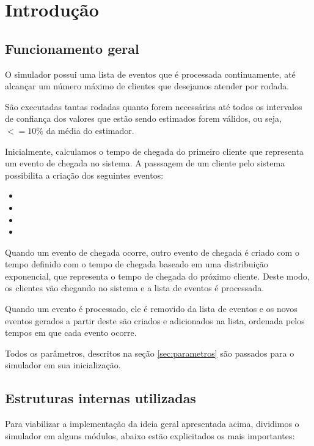 \chapter{Introdução}
\section{Funcionamento geral}

O simulador possui uma lista de eventos que é processada continuamente, até alcançar um número máximo de clientes que desejamos atender por rodada.

São executadas tantas rodadas quanto forem necessárias até todos os intervalos de confiança dos valores que estão sendo estimados forem válidos, ou seja, $<=10\%$ da média do estimador.

Inicialmente, calculamos o tempo de chegada do primeiro cliente que representa um evento de chegada no sistema. A passsagem de um cliente pelo sistema possibilita a criação dos seguintes eventos:
\begin{itemize}
\item <tempo, tipo: chegada no sistema>
\item <tempo, tipo: entrada no servidor pela primeira vez>
\item <tempo, tipo: saída do servidor>
\item <tempo, tipo: entrada no servidor pela segunda vez>
\end{itemize}

Quando um evento de chegada ocorre, outro evento de chegada é criado com o tempo definido com o tempo de chegada baseado em uma distribuição exponencial, que representa o tempo de chegada do próximo cliente. Deste modo, os clientes vão chegando no sistema e a lista de eventos é processada.

Quando um evento é processado, ele é removido da lista de eventos e os novos eventos gerados a partir deste são criados e adicionados na lista, ordenada pelos tempos em que cada evento ocorre.

Todos os parâmetros, descritos na seção \ref{sec:parametros} são passados para o simulador em sua inicialização.

\section{Estruturas internas utilizadas}
Para viabilizar a implementação da ideia geral apresentada acima, dividimos o simulador em alguns módulos, abaixo estão explicitados os mais importantes:\\

